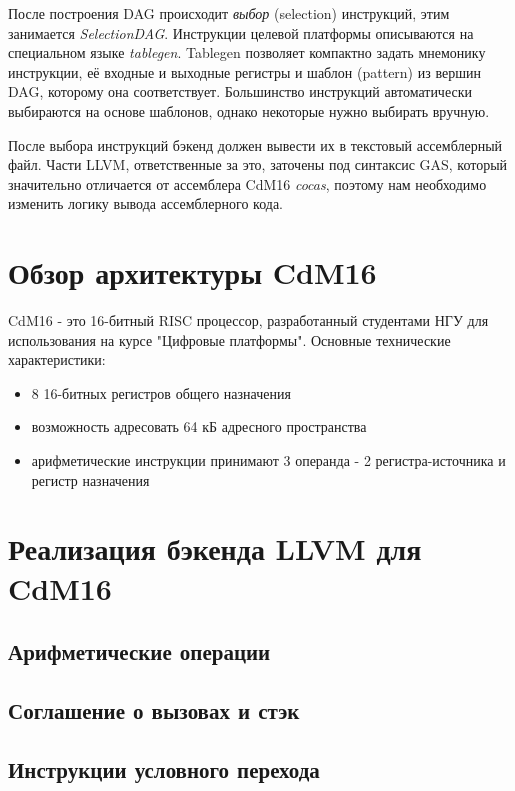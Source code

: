 \documentclass[a4paper,14pt]{extarticle}
\begin{document}
После построения DAG происходит \emph{выбор} (selection) инструкций, этим занимается \emph{SelectionDAG}. Инструкции целевой платформы описываются на специальном языке \emph{tablegen}. Tablegen позволяет компактно задать мнемонику инструкции, её входные и выходные регистры и шаблон (pattern) из вершин DAG, которому она соответствует. Большинство инструкций автоматически выбираются на основе шаблонов, однако некоторые нужно выбирать вручную.

После выбора инструкций бэкенд должен вывести их в текстовый ассемблерный файл. Части LLVM, ответственные за это, заточены под синтаксис GAS, который значительно отличается от ассемблера CdM16 \emph{cocas}, поэтому нам необходимо изменить логику вывода ассемблерного кода.


\pagebreak
\section{Обзор архитектуры CdM16}

CdM16 - это 16-битный RISC процессор, разработанный студентами НГУ для использования на курсе "Цифровые платформы". Основные технические характеристики:
\begin{itemize}
	\item 8 16-битных регистров общего назначения
	\item возможность адресовать 64 кБ адресного пространства
	\item арифметические инструкции принимают 3 операнда - 2 регистра-источника и регистр назначения
	
\end{itemize}

\pagebreak
\section{Реализация бэкенда LLVM для CdM16}
\subsection{Арифметические операции}
\subsection{Соглашение о вызовах и стэк}
\subsection{Инструкции условного перехода}
\end{document}
